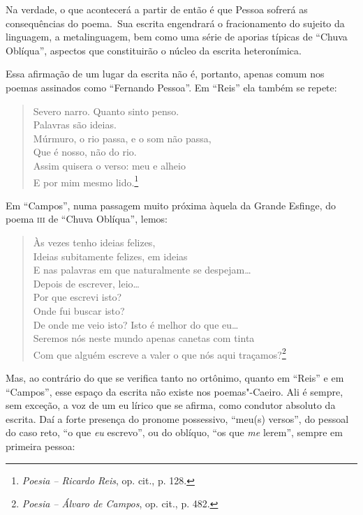 Na verdade, o que acontecerá a partir de então é que Pessoa sofrerá as
consequências do poema.~Sua escrita engendrará o fracionamento do
sujeito da linguagem, a metalinguagem, bem como uma série de aporias
típicas de ``Chuva Oblíqua'', aspectos que constituirão o núcleo da
escrita heteronímica.

Essa afirmação de um lugar da escrita não é, portanto, apenas comum nos
poemas assinados como ``Fernando Pessoa''. Em ``Reis'' ela também se
repete:

\begin{verse}
Severo narro. Quanto sinto penso.\\
Palavras são ideias.\\
Múrmuro, o rio passa, e o som não passa,\\
Que é nosso, não do rio.\\
Assim quisera o verso: meu e alheio\\
E por mim mesmo lido.\footnote{\emph{Poesia -- Ricardo Reis}, op. cit.,
  p. 128.}
\end{verse}

Em ``Campos'', numa passagem muito próxima àquela da Grande Esfinge, do
poema \textsc{iii} de ``Chuva Oblíqua'', lemos:

\begin{verse}
Às vezes tenho ideias felizes,\\
Ideias subitamente felizes, em ideias\\
E nas palavras em que naturalmente se \qb{}despejam\ldots{}\\[5pt]
Depois de escrever, leio\ldots{}\\
Por que escrevi isto?\\
Onde fui buscar isto?\\
De onde me veio isto? Isto é melhor do que \qb{}eu\ldots{}\\[5pt]
Seremos nós neste mundo apenas canetas \qb{}com tinta\\
Com que alguém escreve a valer o que nós \qb{}aqui traçamos?\footnote{\emph{Poesia
  -- Álvaro de Campos}, op. cit., p. 482.}
\end{verse}

Mas, ao contrário do que se verifica tanto no ortônimo, quanto em
``Reis'' e em ``Campos'', esse espaço da escrita não existe nos
poemas"-Caeiro. Ali é sempre, sem exceção, a voz de um eu lírico que se
afirma, como condutor absoluto da escrita. Daí a forte presença do
pronome possessivo, ``meu(s) versos'', do pessoal do caso reto, ``o que
\emph{eu} escrevo'', ou do oblíquo, ``os que \emph{me} lerem'', sempre
em primeira pessoa:

